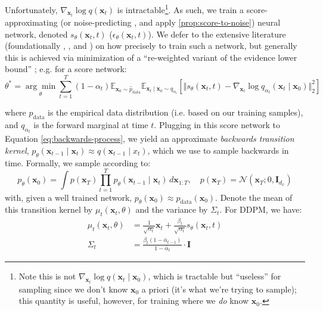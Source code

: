 Unfortunately, $\nabla_{\mathbf{x}_t}\log q(\mathbf{x}_t)$ is intractable\footnote{Note this is not
$\nabla_{\mathbf{x}_t}\log q(\mathbf{x}_t \mid \mathbf{x}_0)$, which is tractable but ``useless''
for sampling since we don't know $\mathbf{x}_0$ a priori (it's what we're trying to sample); this
quantity is useful, however, for training where we \emph{do} know $\mathbf{x}_0$.}.
As such, we train a score-approximating \parencite{songScoreBasedGenerativeModeling2021} (or
noise-predicting \parencite{hoDenoisingDiffusionProbabilistic2020}, and apply
\ref{prop:score-to-noise}) neural network, denoted $s_\theta(\mathbf{x}_t, t)$
($\epsilon_\theta(\mathbf{x}_t, t)$). We defer to the extensive literature (foundationally
\textcite{hoDenoisingDiffusionProbabilistic2020}, \textcite{songGenerativeModelingEstimating2020},
\textcite{songScoreBasedGenerativeModeling2021} and \textcite{nicholImprovedDenoisingDiffusion2021})
on how precisely to train such a network, but generally this is achieved via minimization of a
``re-weighted variant of the evidence lower bound''
\parencite{songScoreBasedGenerativeModeling2021}; e.g. for a score network:
\begin{equation*}
    \theta^* = \underset{\theta}{\arg\min}\sum_{t=1}^T (1 - \alpha_t)\mathbb{E}_{\mathbf{x}_0 \sim \hat{p}_{\text{data}}}\mathbb{E}_{\mathbf{x}_t \mid \mathbf{x}_0 \sim q_{\alpha_t}}\left[\Vert s_\theta(\mathbf{x}_t, t) - \nabla_{\mathbf{x}_t}\log q_{\alpha_t}(\mathbf{x}_t \mid \mathbf{x}_0)\Vert_2^2\right]
\end{equation*}

where $\hat{p}_{\text{data}}$ is the empirical data distribution (i.e. based on our training
samples), and $q_{\alpha_t}$ is the forward marginal at time $t$. Plugging in this score network to
Equation \ref{eq:backwards-process}, we yield an approximate \emph{backwards transition kernel},
$p_\theta(\mathbf{x}_{t-1} \mid \mathbf{x}_t) \approx q(\mathbf{x}_{t-1} \mid x_t)$, which we use to
sample backwards in time. Formally, we sample according to:
\begin{equation}
    p_\theta(\mathbf{x}_0) = \int p(\mathbf{x}_T)\prod_{t=1}^T p_\theta(\mathbf{x}_{t-1} \mid \mathbf{x}_{t})\, d\mathbf{x}_{1:T},\quad p(\mathbf{x}_T) = \mathcal{N}(\mathbf{x}_T; 0, \mathbf{I}_{d_x}) \label{eq:uncond-sampling}
\end{equation}
with, given a well trained network, $p_\theta(\mathbf{x}_0) \approx p_{\text{data}}(\mathbf{x}_0)$.
Denote the mean of this transition kernel by $\mu_t(\mathbf{x}_t, \theta)$ and the variance by
$\Sigma_t$. For DDPM, we have:
\begin{align}
    \mu_t(\mathbf{x}_t, \theta) &= \frac{1}{\sqrt{\alpha_t}}\mathbf{x}_{t} + \frac{\beta_t}{\sqrt{\alpha_t}}s_\theta(\mathbf{x}_t, t) \label{eq:ddpm-mu} \\
    \Sigma_t &= \frac{\beta_t(1 - \overline{\alpha}_{t-1})}{1 - \overline{\alpha}_t}\cdot \mathbf{I} \label{eq:ddpm-sigma}
\end{align}

